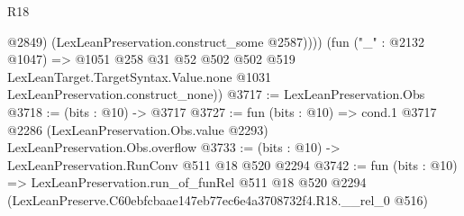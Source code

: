 \begin{lexlean}{R18}
\begin{coremodule}
              @2849)
            (LexLeanPreservation.construct_some @2587))))
      (fun ("_" : @2132 @1047) =>
      @1051
        @258
        @31
        @52
        @502
        @502
        @519
        LexLeanTarget.TargetSyntax.Value.none
        @1031
        LexLeanPreservation.construct_none))
@3717 := LexLeanPreservation.Obs
@3718 := (bits : @10) -> @3717
@3727 := fun (bits : @10) =>
  cond.{1} @3717 @2286 (LexLeanPreservation.Obs.value @2293) LexLeanPreservation.Obs.overflow
@3733 := (bits : @10) -> LexLeanPreservation.RunConv @511 @18 @520 @2294
@3742 := fun (bits : @10) =>
  LexLeanPreservation.run_of_funRel
    @511
    @18
    @520
    @2294
    (LexLeanPreserve.C60ebfcbaae147eb77ec6e4a3708732f4.R18.__rel_0 @516)
\end{coremodule}
\end{lexlean}
